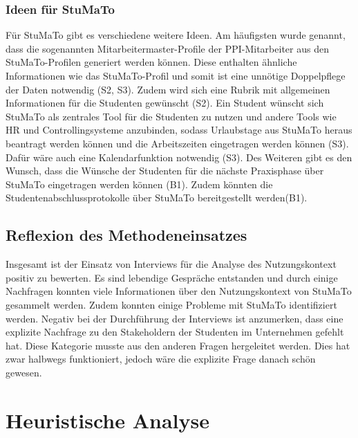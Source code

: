 \documentclass[
  12pt,
  ngerman,
  a4paper,
]{article}
\begin{document}
\hypertarget{ideen-fuxfcr-stumato}{%
\subsubsection{Ideen für StuMaTo}\label{ideen-fuxfcr-stumato}}

Für StuMaTo gibt es verschiedene weitere Ideen. Am häufigsten wurde
genannt, dass die sogenannten Mitarbeitermaster-Profile der
PPI-Mitarbeiter aus den StuMaTo-Profilen generiert werden können. Diese
enthalten ähnliche Informationen wie das StuMaTo-Profil und somit ist
eine unnötige Doppelpflege der Daten notwendig (S2, S3). Zudem wird sich
eine Rubrik mit allgemeinen Informationen für die Studenten gewünscht
(S2). Ein Student wünscht sich StuMaTo als zentrales Tool für die
Studenten zu nutzen und andere Tools wie HR und Controllingsysteme
anzubinden, sodass Urlaubstage aus StuMaTo heraus beantragt werden
können und die Arbeitszeiten eingetragen werden können (S3). Dafür wäre
auch eine Kalendarfunktion notwendig (S3). Des Weiteren gibt es den
Wunsch, dass die Wünsche der Studenten für die nächste Praxisphase über
StuMaTo eingetragen werden können (B1). Zudem könnten die
Studentenabschlussprotokolle über StuMaTo bereitgestellt werden(B1).

\hypertarget{reflexion-des-methodeneinsatzes}{%
\subsection{Reflexion des
Methodeneinsatzes}\label{reflexion-des-methodeneinsatzes}}

Insgesamt ist der Einsatz von Interviews für die Analyse des
Nutzungskontext positiv zu bewerten. Es sind lebendige Gespräche
entstanden und durch einige Nachfragen konnten viele Informationen über
den Nutzungskontext von StuMaTo gesammelt werden. Zudem konnten einige
Probleme mit StuMaTo identifiziert werden. Negativ bei der Durchführung
der Interviews ist anzumerken, dass eine explizite Nachfrage zu den
Stakeholdern der Studenten im Unternehmen gefehlt hat. Diese Kategorie
musste aus den anderen Fragen hergeleitet werden. Dies hat zwar halbwegs
funktioniert, jedoch wäre die explizite Frage danach schön gewesen.

\newpage

\hypertarget{sec:heur-anal}{%
\section{Heuristische Analyse}\label{sec:heur-anal}}
\end{document}
